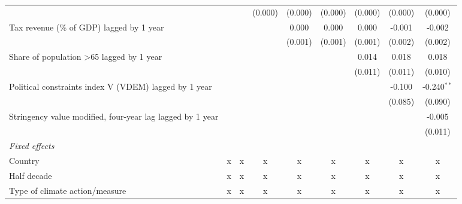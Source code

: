 \begin{tabular}{lcccccccc}
                                                             &                &                & (0.000)       & (0.000)       & (0.000)       & (0.000)      & (0.000)       & (0.000)\\   
   Tax revenue (\% of GDP) lagged by 1 year                  &                &                &               & 0.000         & 0.000         & 0.000        & -0.001        & -0.002\\   
                                                             &                &                &               & (0.001)       & (0.001)       & (0.001)      & (0.002)       & (0.002)\\   
   Share of population >65 lagged by 1 year                  &                &                &               &               &               & 0.014        & 0.018         & 0.018\\   
                                                             &                &                &               &               &               & (0.011)      & (0.011)       & (0.010)\\   
   Political constraints index V (VDEM) lagged by 1 year     &                &                &               &               &               &              & -0.100        & -0.240$^{**}$\\   
                                                             &                &                &               &               &               &              & (0.085)       & (0.090)\\   
   Stringency value modified, four-year lag lagged by 1 year &                &                &               &               &               &              &               & -0.005\\   
                                                             &                &                &               &               &               &              &               & (0.011)\\   
   \emph{Fixed effects}\\
   Country                                                   & x              & x              & x             & x             & x             & x            & x             & x\\  
   Half decade                                               & x              & x              & x             & x             & x             & x            & x             & x\\  
   Type of climate action/measure                            & x              & x              & x             & x             & x             & x            & x             & x\\  

\end{tabular}
